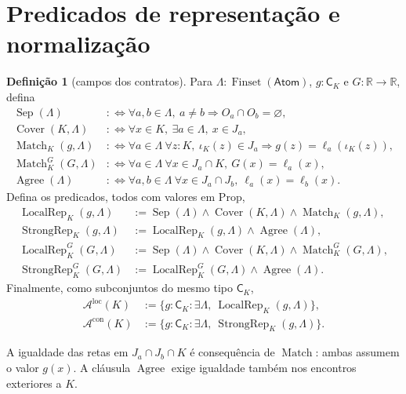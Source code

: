 \documentclass[12pt,a4paper]{article}
\theoremstyle{preciso}
\theoremstyle{definition}
\newtheorem{definicao}[teorema]{Definição}
\newcommand{\R}{\mathbb R}
\newcommand{\Atoms}{\mathsf{Atom}}
\newcommand{\CK}{\mathsf C_K}
\newcommand{\FS}{\operatorname{Finset}}
\newcommand{\Sep}{\operatorname{Sep}}
\newcommand{\Cov}{\operatorname{Cover}}
\newcommand{\Match}{\operatorname{Match}}
\newcommand{\Agree}{\operatorname{Agree}}
\newcommand{\Loc}{\operatorname{LocalRep}}
\newcommand{\Str}{\operatorname{StrongRep}}
\newcommand{\Aloc}{\mathcal A^{\mathrm{loc}}}
\newcommand{\Astr}{\mathcal A^{\mathrm{con}}}
\theoremstyle{preciso}
\theoremstyle{preciso}
\theoremstyle{preciso}
\theoremstyle{preciso}
\theoremstyle{definition}
\theoremstyle{preciso}
\theoremstyle{definition}
\theoremstyle{preciso}
\theoremstyle{preciso}
\theoremstyle{definition}
\begin{document}
\section{Predicados de representação e normalização}
\label{normalizacao:sec:normalization}

\begin{definicao}[campos dos contratos]\label{map:normalizacao:3.1}\label{normalizacao:def:contracts}
Para $\Lambda:\FS(\Atoms)$, $g:\CK$ e $G:\R\to\R$, defina
\begin{align*}
 \Sep(\Lambda)&:\Longleftrightarrow
  \forall a,b\in\Lambda,\ a\ne b\Rightarrow O_a\cap O_b=\varnothing,\\
 \Cov(K,\Lambda)&:\Longleftrightarrow
  \forall x\in K,\ \exists a\in\Lambda,\ x\in J_a,\\
 \Match_K(g,\Lambda)&:\Longleftrightarrow
  \forall a\in\Lambda\ \forall z:K,\
       \iota_K(z)\in J_a\Rightarrow g(z)=\ell_a(\iota_K(z)),\\
 \Match^G_K(G,\Lambda)&:\Longleftrightarrow
  \forall a\in\Lambda\ \forall x\in J_a\cap K,\ G(x)=\ell_a(x),\\
 \Agree(\Lambda)&:\Longleftrightarrow
  \forall a,b\in\Lambda\ \forall x\in J_a\cap J_b,\
       \ell_a(x)=\ell_b(x).
\end{align*}
Defina os predicados, todos com valores em $\mathrm{Prop}$,
\begin{align*}
 \Loc_K(g,\Lambda)&:=\Sep(\Lambda)\land\Cov(K,\Lambda)
                         \land\Match_K(g,\Lambda),\\
 \Str_K(g,\Lambda)&:=\Loc_K(g,\Lambda)\land\Agree(\Lambda),\\
 \Loc^G_K(G,\Lambda)&:=\Sep(\Lambda)\land\Cov(K,\Lambda)
                         \land\Match^G_K(G,\Lambda),\\
 \Str^G_K(G,\Lambda)&:=\Loc^G_K(G,\Lambda)\land\Agree(\Lambda).
\end{align*}
Finalmente, como subconjuntos do mesmo tipo $\CK$,
\begin{align*}
 \Aloc(K)&:=\{g:\CK:\exists\Lambda,\ \Loc_K(g,\Lambda)\},\\
 \Astr(K)&:=\{g:\CK:\exists\Lambda,\ \Str_K(g,\Lambda)\}.
\end{align*}
\end{definicao}

A igualdade das retas em $J_a\cap J_b\cap K$ é consequência de
$\Match$: ambas assumem o valor $g(x)$. A cláusula $\Agree$ exige
igualdade também nos encontros exteriores a $K$.
\end{document}
